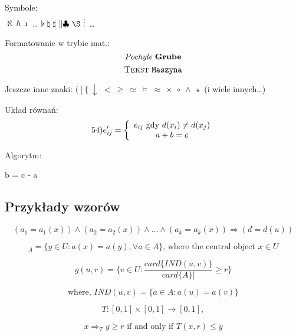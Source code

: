 ﻿\documentclass[a4paper,12pt]{article}
\begin{document}
Symbole:\\
$ \aleph \ \hbar \ \imath $ \dots 
$ \flat \ \natural \ \sharp \ \| \clubsuit \ \S \ \vdots $ \dots 


Formatowanie w trybie mat.: \\
$$	\emph{Pochyle} \ \textbf{Grube}$$
$$ \textsc{Tekst} \ \verb"Maszyna"	$$

Jeszcze inne znaki:
$ ( \ [ \ \{ \ \downarrow $
$ < \ \geq \ \simeq \ \models \ \approx \ \times \ \circ \ \wedge \ \star$
(i wiele innych\dots)

Układ równań:
$$54) e'_{ij}= 
\left \{ 
			\begin{array}{c}
			e_{ij} \ {\rm gdy}\ d(x_i) \neq d(x_j) \\
			a + b = c\\
\end{array}
\right. $$

Algorytm:
\begin{algorithmic}
\item{b = c - a}
\EndIf
\end{algorithmic}

\subsection{Przykłady wzorów}

\begin{displaymath}
(a_1=a_1(x)) \wedge (a_2=a_2(x)) \wedge \dots \wedge
(a_k=a_k(x)) \Rightarrow (d=d(u))
\end{displaymath}

\begin{displaymath}
	[x]_A=\{y\in{}U:a(x)=a(y),\forall{}a\in{}A\}
	\textrm{, where the central
	object }x\in{}U
\end{displaymath}

\begin{displaymath}
	g(u,r)=\{v\in{}U:\frac{card\{IND(u,v)\}}
	{card\{A\}|}\geq{}r\}
\end{displaymath}

\begin{displaymath}
	\textrm{where, }IND(u,v)=\{a\in{}A:a(u)=a(v)\}
\end{displaymath}

\begin{displaymath}
	T:[0,1]\times[0,1]\rightarrow[0,1],
\end{displaymath}

\begin{displaymath}
	x\Rightarrow_Ty\geq{}r\textrm{ if and only if }T(x,r)\leq{}y
\end{displaymath}
\end{document}
